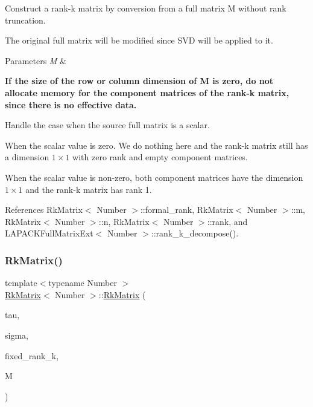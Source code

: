Construct a rank-\/k matrix by conversion from a full matrix {\ttfamily M} without rank truncation.


\begin{DoxyDescription}
\item[Note ]The original full matrix {\ttfamily will} be modified since S\+VD will be applied to it. 
\end{DoxyDescription}
\begin{DoxyParams}{Parameters}
{\em M} & \\
\hline
\end{DoxyParams}
{\bfseries If the size of the row or column dimension of {\ttfamily M} is zero, do not allocate memory for the component matrices of the rank-\/k matrix, since there is no effective data.}

Handle the case when the source full matrix is a scalar.

When the scalar value is zero. We do nothing here and the rank-\/k matrix still has a dimension $1 \times 1$ with zero rank and empty component matrices.

When the scalar value is non-\/zero, both component matrices have the dimension $1 \times 1$ and the rank-\/k matrix has rank 1.

References Rk\+Matrix$<$ Number $>$\+::formal\+\_\+rank, Rk\+Matrix$<$ Number $>$\+::m, Rk\+Matrix$<$ Number $>$\+::n, Rk\+Matrix$<$ Number $>$\+::rank, and L\+A\+P\+A\+C\+K\+Full\+Matrix\+Ext$<$ Number $>$\+::rank\+\_\+k\+\_\+decompose().

\mbox{\label{classRkMatrix_acdd046caab506cd04e09b65bb3ffc1f9}} 
\subsubsection{\texorpdfstring{Rk\+Matrix()}{RkMatrix()}\hspace{0.1cm}{\footnotesize\ttfamily [6/19]}}
{\footnotesize\ttfamily template$<$typename Number $>$ \\
\hyperlink{classRkMatrix}{Rk\+Matrix}$<$ Number $>$\+::\hyperlink{classRkMatrix}{Rk\+Matrix} (\begin{DoxyParamCaption}\item[{const std\+::vector$<$ types\+::global\+\_\+dof\+\_\+index $>$ \&}]{tau,  }\item[{const std\+::vector$<$ types\+::global\+\_\+dof\+\_\+index $>$ \&}]{sigma,  }\item[{const \hyperlink{classRkMatrix_add060bfc3a4cc77f858c3d6dd58cadd5}{size\+\_\+type}}]{fixed\+\_\+rank\+\_\+k,  }\item[{const \hyperlink{classLAPACKFullMatrixExt}{L\+A\+P\+A\+C\+K\+Full\+Matrix\+Ext}$<$ Number $>$ \&}]{M }\end{DoxyParamCaption})}

